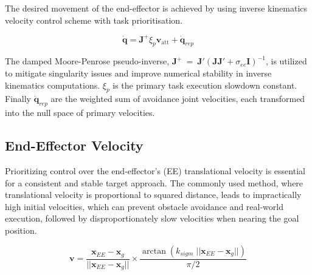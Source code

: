 \documentclass[letterpaper, 10 pt, conference]{ieeeconf}  %
\begin{document}
The desired movement of the end-effector is achieved by using inverse kinematics velocity control scheme with task prioritisation. 

\begin{equation}
	\dot{\mathbf{q}} = \mathbf{J}^+ \xi_{p} \mathrm{\mathbf{v}_{att}} + \dot{\mathbf{q}}_{rep}
\end{equation}

The damped Moore-Penrose pseudo-inverse, \(\mathbf{J}^+~=~\mathbf{J}'(\mathbf{J}\mathbf{J}' + \sigma_{ee} \mathbf{I})^{-1}\), is utilized to mitigate singularity issues and improve numerical stability in inverse kinematics computations. $\xi_{p}$ is the primary task execution slowdown constant. Finally $\dot{\mathbf{q}}_{rep}$ are the weighted sum of avoidance joint velocities, each transformed into the null space of primary velocities.


\subsection{End-Effector Velocity}

Prioritizing control over the end-effector's (EE) translational velocity is essential for a consistent and stable target approach. The commonly used method, where translational velocity is proportional to squared distance, leads to impractically high initial velocities, which can prevent obstacle avoidance and real-world execution, followed by disproportionately slow velocities when nearing the goal position. 


\begin{equation} 
	\mathbf{v} = \frac{\mathbf{x}_{EE} - \mathbf{x}_g}{||\mathbf{x}_{EE} - \mathbf{x}_g||} \times \frac{\arctan(k_{sigm} \; ||\mathbf{x}_{EE} - \mathbf{x}_g||) }{\pi/2}
	\label{eq: v_att}
\end{equation}
\end{document}

